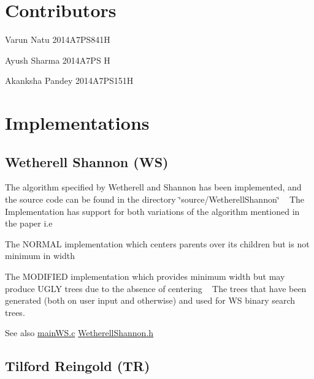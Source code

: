 \hypertarget{index_Contributors}{}\section{Contributors}\label{index_Contributors}

\begin{DoxyItemize}
\item Varun Natu 2014\+A7\+P\+S841H
\item Ayush Sharma 2014\+A7\+PS H
\item Akanksha Pandey 2014\+A7\+P\+S151H 
\end{DoxyItemize}\hypertarget{index_Implementations}{}\section{Implementations}\label{index_Implementations}
\hypertarget{index_algo1}{}\subsection{Wetherell Shannon (\+W\+S)}\label{index_algo1}
The algorithm specified by Wetherell and Shannon has been implemented, and the source code can be found in the directory \char`\"{}source/\+Wetherell\+Shannon\char`\"{} ~\newline
 The Implementation has support for both variations of the algorithm mentioned in the paper i.\+e
\begin{DoxyItemize}
\item The N\+O\+R\+M\+AL implementation which centers parents over it\textquotesingle{}s children but is not minimum in width
\item The M\+O\+D\+I\+F\+I\+ED implementation which provides minimum width but may produce \textquotesingle{}U\+G\+LY\textquotesingle{} trees due to the absence of centering ~\newline
 The trees that have been generated (both on user input and otherwise) and used for WS binary search trees.~\newline
\begin{DoxySeeAlso}{See also}
\hyperlink{main_w_s_8c}{main\+W\+S.\+c} \hyperlink{_wetherell_shannon_8h}{Wetherell\+Shannon.\+h} 
\end{DoxySeeAlso}

\end{DoxyItemize}\hypertarget{index_algo2}{}\subsection{Tilford Reingold (\+T\+R)}\label{index_algo2}
